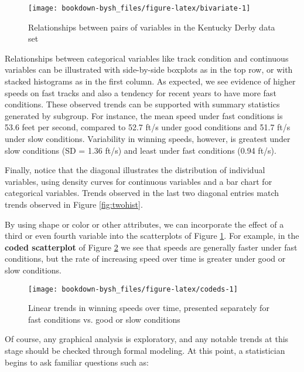 \documentclass[
]{krantz}
\begin{document}
\begin{figure}

{\centering \texttt{[image: bookdown-bysh\_files/figure-latex/bivariate-1]} 

}

\caption{Relationships between pairs of variables in the Kentucky Derby data set}\label{fig:bivariate}
\end{figure}

Relationships between categorical variables like track condition and continuous variables can be illustrated with side-by-side boxplots as in the top row, or with stacked histograms as in the first column. As expected, we see evidence of higher speeds on fast tracks and also a tendency for recent years to have more fast conditions. These observed trends can be supported with summary statistics generated by subgroup. For instance, the mean speed under fast conditions is 53.6 feet per second, compared to 52.7 ft/s under good conditions and 51.7 ft/s under slow conditions. Variability in winning speeds, however, is greatest under slow conditions (SD = 1.36 ft/s) and least under fast conditions (0.94 ft/s).

Finally, notice that the diagonal illustrates the distribution of individual variables, using density curves for continuous variables and a bar chart for categorical variables. Trends observed in the last two diagonal entries match trends observed in Figure \ref{fig:twohist}.

By using shape or color or other attributes, we can incorporate the effect of a third or even fourth variable into the scatterplots of Figure \ref{fig:bivariate}. For example, in the \textbf{coded scatterplot} of Figure \ref{fig:codeds} we see that speeds are generally faster under fast conditions, but the rate of increasing speed over time is greater under good or slow conditions.

\begin{figure}

{\centering \texttt{[image: bookdown-bysh\_files/figure-latex/codeds-1]} 

}

\caption{Linear trends in winning speeds over time, presented separately for fast conditions vs. good or slow conditions}\label{fig:codeds}
\end{figure}

Of course, any graphical analysis is exploratory, and any notable trends at this stage should be checked through formal modeling. At this point, a statistician begins to ask familiar questions such as:
\end{document}

